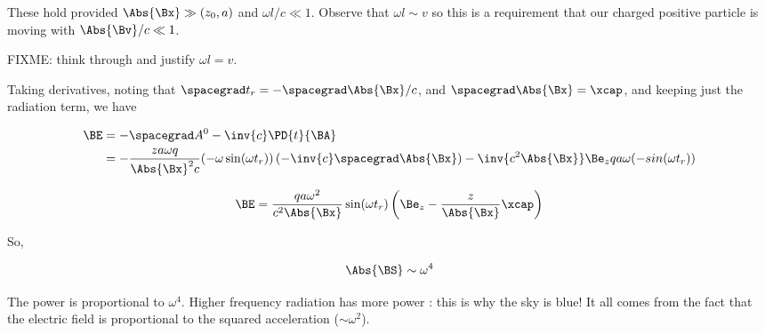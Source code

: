 These hold provided $\Abs{\Bx} \gg (z_0, a)$ and $\omega l/c \ll 1$.  Observe that $\omega l \sim v$ so this is a requirement that our charged positive particle is moving with $\Abs{\Bv}/c \ll 1$.

FIXME: think through and justify $\omega l = v$.

Taking derivatives, noting that $\spacegrad t_r = -\spacegrad \Abs{\Bx}/c$, and $\spacegrad \Abs{\Bx} = \xcap$, and keeping just the radiation term, we have

\begin{align*}
\BE 
&= -\spacegrad A^0 - \inv{c} \PD{t}{\BA} \\
&= -\frac{z a \omega q}{\Abs{\Bx}^2 c} (-\omega \sin(\omega t_r)) \left( - \inv{c} \spacegrad \Abs{\Bx} \right)
- \inv{c^2 \Abs{\Bx}} \Be_z q a \omega (-sin(\omega t_r))
\end{align*}

\begin{equation}\label{eqn:relativisticElectrodynamicsL20:420}
\BE = \frac{ q a \omega^2 }{c^2 \Abs{\Bx}} \sin(\omega t_r) \left( \Be_z - \frac{z}{\Abs{\Bx}} \xcap \right)
\end{equation}

So,

\begin{equation}\label{eqn:relativisticElectrodynamicsL20:440}
\Abs{\BS} \sim \omega^4
\end{equation}

The power is proportional to $\omega^4$.  Higher frequency radiation has more power : this is why the sky is blue!  It all comes from the fact that the electric field is proportional to the squared acceleration ($\sim \omega^2$).

\EndArticle
